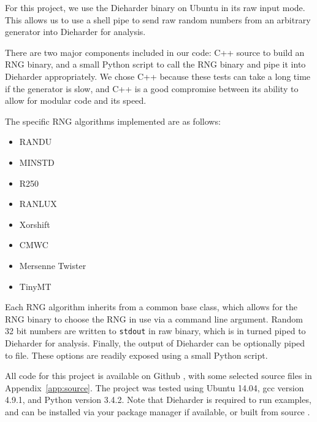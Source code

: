 For this project, we use the Dieharder binary on Ubuntu in its raw input mode. This allows us to use a shell pipe to send raw random numbers from an arbitrary generator into Dieharder for analysis.

There are two major components included in our code: C++ source to build an RNG binary, and a small Python script to call the RNG binary and pipe it into Dieharder appropriately. We chose C++ because these tests can take a long time if the generator is slow, and C++ is a good compromise between its ability to allow for modular code and its speed.

The specific RNG algorithms implemented are as follows:
\begin{multicols}{2}
\begin{itemize}
    \item RANDU
    \item MINSTD
    \item R250
    \item RANLUX
    \item Xorshift
    \item CMWC
    \item Mersenne Twister
    \item TinyMT
\end{itemize}
\end{multicols}
Each RNG algorithm inherits from a common base class, which allows for the RNG binary to choose the RNG in use via a command line argument. Random 32 bit numbers are written to \texttt{stdout} in raw binary, which is in turned piped to Dieharder for analysis. Finally, the output of Dieharder can be optionally piped to file. These options are readily exposed using a small Python script.

All code for this project is available on Github \cite{github_repo}, with some selected source files in Appendix~\ref{app:source}. The project was tested using Ubuntu 14.04, gcc version 4.9.1, and Python version 3.4.2. Note that Dieharder is required to run examples, and can be installed via your package manager if available, or built from source \cite{dieharder_website}.
